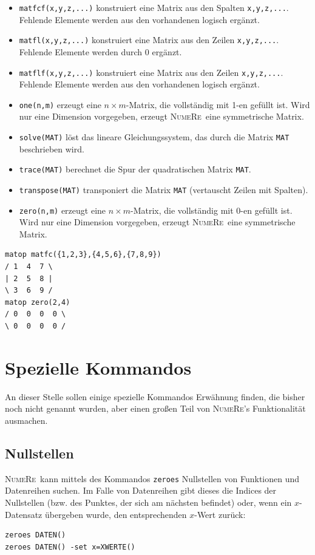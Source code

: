 \documentclass[DIV=14,headsepline,footsepline]{scrbook}
\newcommand{\NR}{\textsc{Nu\-me\-Re}}
\begin{document}
\begin{itemize}
					\item \lstinline+matfcf(x,y,z,...)+ konstruiert eine Matrix aus den Spalten \lstinline+x,y,z,...+. Fehlende Elemente werden aus den vorhandenen logisch ergänzt.
					\item \lstinline+matfl(x,y,z,...)+ konstruiert eine Matrix aus den Zeilen \lstinline+x,y,z,...+. Fehlende Elemente werden durch 0 ergänzt.
					\item \lstinline+matflf(x,y,z,...)+ konstruiert eine Matrix aus den Zeilen \lstinline+x,y,z,...+. Fehlende Elemente werden aus den vorhandenen logisch ergänzt.
					\item \lstinline+one(n,m)+ erzeugt eine $n\times m$-Matrix, die vollständig mit 1-en gefüllt ist. Wird nur eine Dimension vorgegeben, erzeugt \NR\ eine symmetrische Matrix.
					\item \lstinline+solve(MAT)+ löst das lineare Gleichungssystem, das durch die Matrix \lstinline+MAT+ beschrieben wird.
					\item \lstinline+trace(MAT)+ berechnet die Spur der quadratischen Matrix \lstinline+MAT+.
					\item \lstinline+transpose(MAT)+ transponiert die Matrix \lstinline+MAT+ (vertauscht Zeilen mit Spalten).
					\item \lstinline+zero(n,m)+ erzeugt eine $n\times m$-Matrix, die vollständig mit 0-en gefüllt ist. Wird nur eine Dimension vorgegeben, erzeugt \NR\ eine symmetrische Matrix.
				\end{itemize}
				\begin{lstlisting}
matop matfc({1,2,3},{4,5,6},{7,8,9})
/ 1  4  7 \
| 2  5  8 |
\ 3  6  9 /
matop zero(2,4)
/ 0  0  0  0 \
\ 0  0  0  0 /
				\end{lstlisting}
		\chapter{Spezielle Kommandos}
			An dieser Stelle sollen einige spezielle Kommandos Erwähnung finden, die bisher noch nicht genannt wurden, aber einen großen Teil von \NR's Funktionalität ausmachen.
			\section{Nullstellen}
				\NR\ kann mittels des Kommandos \lstinline+zeroes+\cmd{zeroes} Nullstellen von Funktionen und Datenreihen suchen. Im Falle von Datenreihen gibt dieses die Indices der Nullstellen (bzw. des Punktes, der sich am nächsten befindet) oder, wenn ein $x$-Datensatz übergeben wurde, den entsprechenden $x$-Wert zurück:
				\begin{lstlisting}
zeroes DATEN()
zeroes DATEN() -set x=XWERTE()
				\end{lstlisting}
				
\end{document}
